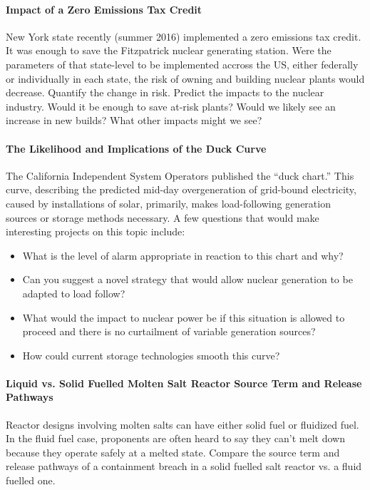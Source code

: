 \documentclass[12pts, answers]{exam}
\begin{document}
\paragraph{Impact of a Zero Emissions Tax Credit} New York state recently
(summer 2016) implemented a zero emissions tax credit. It was enough to save
the Fitzpatrick nuclear generating station. Were the parameters of that
state-level to be implemented accross the US, either federally or individually
in each state, the risk of owning and building nuclear plants would decrease.
Quantify the change in risk. Predict the impacts to the nuclear industry. Would
it be enough to save at-risk plants? Would we likely see an increase in new
builds? What other impacts might we see?

\paragraph{The Likelihood and Implications of the Duck Curve} The California
Independent System Operators published the ``duck chart.'' This curve,
describing the predicted mid-day overgeneration of grid-bound electricity,
caused by installations of solar, primarily, makes load-following generation
sources or storage methods necessary. A few questions that would make
interesting projects on this topic include:
\begin{itemize}
\item What is the level of alarm appropriate in reaction to this chart and why?
\item Can you suggest a novel strategy that would allow nuclear generation to
be adapted to load follow?
\item What would the impact to nuclear power be if this situation is allowed to
proceed and there is no curtailment of variable generation sources?
\item How could current storage technologies smooth this curve?
\end{itemize}

\paragraph{Liquid vs. Solid Fuelled Molten Salt Reactor Source Term and Release
Pathways} Reactor designs involving molten salts can have either solid fuel or
fluidized fuel. In the fluid fuel case, proponents are often heard to say they
can't melt down because they operate safely at a melted state. Compare the
source term and release pathways of a containment breach in a solid fuelled
salt reactor vs. a fluid fuelled one.
\end{document}
